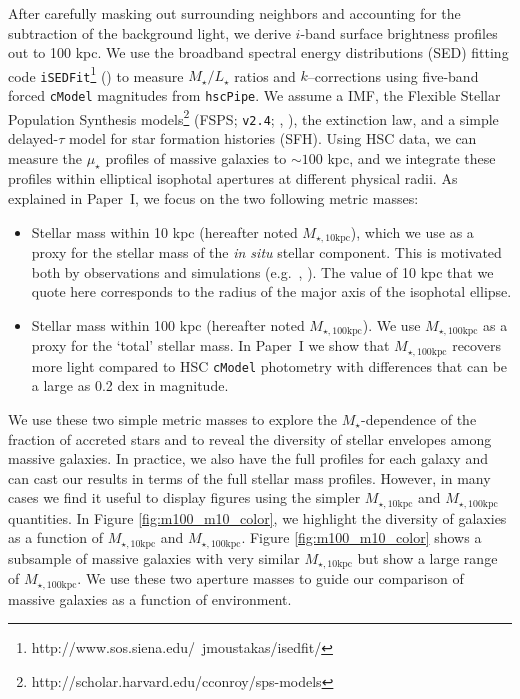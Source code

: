 \documentclass[a4paper,fleqn,usenatbib]{mnras}
\def\cmodel{\texttt{cModel}}
\def\mstar{{$M_{\star}$}}
\def\minn{{$M_{\star,10\mathrm{kpc}}$}}
\def\mtot{{$M_{\star,100\mathrm{kpc}}$}}
\def\m2l{{$M_{\star}/L_{\star}$}}
\def\mden{{$\mu_{\star}$}}
\begin{document}
    After carefully 
    masking out surrounding neighbors and accounting for the subtraction of the 
    background light, we derive $i$-band surface brightness profiles out to 100 kpc. 
    We use the broadband spectral energy distributions (SED) fitting code 
    \texttt{iSEDFit}\footnote{http://www.sos.siena.edu/~jmoustakas/isedfit/} 
    (\citealt{Moustakas13}) to measure \m2l{} ratios and $k$--corrections using 
    five-band forced \cmodel{} magnitudes from \texttt{hscPipe}. 
    We assume a \citet{Chabrier2003} IMF, the Flexible Stellar Population 
    Synthesis models\footnote{http://scholar.harvard.edu/cconroy/sps-models}
    (FSPS; \texttt{v2.4}; \citealt{FSPS}, \citealt{Conroy2010}), the 
    \citet{Calzetti2000} extinction law, and a simple delayed-$\tau$ model for 
    star formation histories (SFH). 
    Using HSC data, we can measure the \mden{} profiles of massive galaxies to 
    $\sim 100$ kpc, and we integrate these profiles within elliptical isophotal
    apertures at different physical radii. 
    As explained in Paper~I, we focus on the two following metric masses:
        
    \begin{itemize}
    
        \item Stellar mass within 10 kpc (hereafter noted \minn{}), which we use 
            as a proxy for the stellar mass of the \textit{in situ} stellar 
            component. 
            This is motivated both by observations and simulations 
            (e.g.~\citealt{vanDokkum2010}, \citealt{RodriguezGomez2016}). 
            The value of 10 kpc that we quote here corresponds to the radius of the 
            major axis of the isophotal ellipse.
            
        \item Stellar mass within 100 kpc (hereafter noted \mtot{}). 
            We use \mtot{} as a proxy for the `total' stellar mass. 
            In Paper~I we show that \mtot{} recovers more light compared to 
            HSC \cmodel{} photometry with differences that can be a large as 0.2 dex 
            in magnitude.        
               
   \end{itemize}
   
   We use these two simple metric masses to explore the \mstar{}-dependence of the 
   fraction of accreted stars and to reveal the diversity of stellar envelopes among 
   massive galaxies. 
   In practice, we also have the full profiles for each galaxy and can cast our 
   results in terms of the full stellar mass profiles. 
   However, in many cases we find it useful to display figures using the simpler 
   \minn{} and \mtot{} quantities. 
   In Figure \ref{fig:m100_m10_color}, we highlight the diversity of galaxies as a 
   function of \minn{} and \mtot{}. 
   Figure \ref{fig:m100_m10_color} shows a subsample of massive galaxies with very 
   similar \minn{} but show a large range of \mtot{}. 
   We use these two aperture masses to guide our comparison of massive galaxies 
   as a function of environment.  
   
\end{document}
